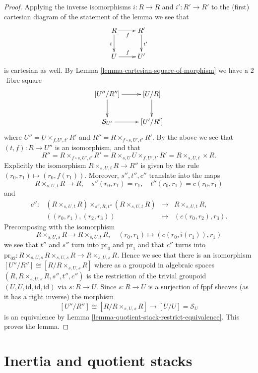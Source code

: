 \documentclass{stacks-project}
\theoremstyle{plain}
\theoremstyle{definition}
\theoremstyle{remark}
\numberwithin{equation}{subsection}
\begin{document}
\begin{proof}
Applying the inverse isomorphisms $i : R \to R$ and $i' : R' \to R'$
to the (first) cartesian diagram of the statement of the lemma we see
that
$$
\xymatrix{
R \ar[d]_t \ar[r]_f & R' \ar[d]^{t'} \\
U \ar[r]^f & U'
}
$$
is cartesian as well. By
Lemma \ref{lemma-cartesian-square-of-morphism}
we have a $2$-fibre square
$$
\xymatrix{
[U''/R''] \ar[d] \ar[r] & [U/R] \ar[d] \\
\mathcal{S}_{U'} \ar[r] & [U'/R']
}
$$
where $U'' = U \times_{f, U', t'} R'$ and
$R'' = R \times_{f \circ s, U', t'} R'$. By the above
we see that $(t, f) : R \to U''$ is an isomorphism, and that
$$
R'' =
R \times_{f \circ s, U', t'} R' =
R \times_{s, U} U \times_{f, U', t'} R' =
R \times_{s, U, t} \times R.
$$
Explicitly the isomorphism $R \times_{s, U, t} R \to R''$ is given by
the rule $(r_0, r_1) \mapsto (r_0, f(r_1))$.
Moreover, $s'', t'', c''$ translate into the maps
$$
R \times_{s, U, t} R \to R,
\quad
s''(r_0, r_1) = r_1, \quad t''(r_0, r_1) = c(r_0, r_1)
$$
and
$$
\begin{matrix}
c'' : &
(R \times_{s, U, t} R) \times_{s'', R, t''} (R \times_{s, U, t} R)
&
\longrightarrow
&
R \times_{s, U, t} R, \\
&
((r_0, r_1), (r_2, r_3)) &
\longmapsto & (c(r_0, r_2), r_3).
\end{matrix}
$$
Precomposing with the isomorphism
$$
R \times_{s, U, s} R \longrightarrow R \times_{s, U, t} R,
\quad
(r_0, r_1) \longmapsto (c(r_0, i(r_1)), r_1)
$$
we see that $t''$ and $s''$ turn into
$\text{pr}_0$ and $\text{pr}_1$ and that $c''$ turns into
$\text{pr}_{02} :
R \times_{s, U, s} R \times_{s, U, s} R \to R \times_{s, U, s} R$.
Hence we see that there is an isomorphism
$[U''/R''] \cong [R/R \times_{s, U, s} R]$ where as a groupoid
in algebraic spaces $(R, R \times_{s, U, s} R, s'', t'', c'')$
is the restriction of the trivial groupoid
$(U, U, \text{id}, \text{id}, \text{id})$ via $s : R \to U$.
Since $s : R \to U$ is a surjection of fppf sheaves (as it has a
right inverse) the morphism
$$
[U''/R''] \cong [R/R \times_{s, U, s} R]
\longrightarrow
[U/U] = \mathcal{S}_U
$$
is an equivalence by
Lemma \ref{lemma-quotient-stack-restrict-equivalence}.
This proves the lemma.
\end{proof}





\section{Inertia and quotient stacks}
\label{section-inertia}
\end{document}
